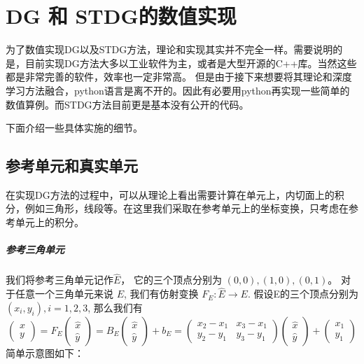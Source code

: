 \chapter{DG 和 STDG的数值实现}
为了数值实现DG以及STDG方法，理论和实现其实并不完全一样。需要说明的是，目前实现DG方法大多以工业软件为主，或者是大型开源的C++库。当然这些都是非常完善的软件，效率也一定非常高。
但是由于接下来想要将其理论和深度学习方法融合，python语言是离不开的。因此有必要用python再实现一些简单的数值算例。而STDG方法目前更是基本没有公开的代码。

下面介绍一些具体实施的细节。
\section{参考单元和真实单元}
在实现DG方法的过程中，可以从理论上看出需要计算在单元上，内切面上的积分，例如三角形，线段等。在这里我们采取在参考单元上的坐标变换，只考虑在参考单元上的积分。

\paragraph*{参考三角单元}
我们将参考三角单元记作$\hat{E}$， 它的三个顶点分别为 $(0,0),(1,0),(0,1)$。 对于任意一个三角单元来说 $E$, 我们有仿射变换 $F_E:\hat{E}\rightarrow E$.
假设E的三个顶点分别为 $(x_i, y_i),i=1,2,3$, 那么我们有
$$
\begin{pmatrix}
    x\\y
\end{pmatrix} = F_E\begin{pmatrix}
    \hat{x}\\ 
    \hat{y}
\end{pmatrix}=B_E\begin{pmatrix}
    \hat{x}\\ 
    \hat{y}
\end{pmatrix}+b_E=\begin{pmatrix}
    x_2-x_1 & x_3-x_1\\
    y_2-y_1 & y_3-y_1
\end{pmatrix}\begin{pmatrix}
    \hat{x}\\ 
    \hat{y}
\end{pmatrix}+\begin{pmatrix}
    x_1\\y_1
\end{pmatrix}
$$ 
简单示意图如下：
\begin{center}
\end{center}


